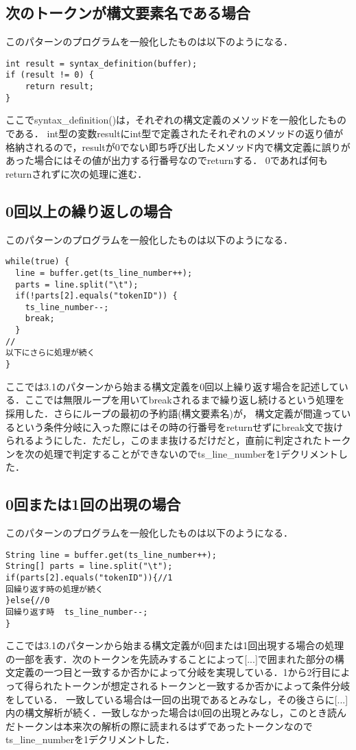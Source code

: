 \documentclass[dvipdfmx]{jarticle}
\begin{document}
\subsection{次のトークンが構文要素名である場合}
このパターンのプログラムを一般化したものは以下のようになる．
\begin{lstlisting}
int result = syntax_definition(buffer);
if (result != 0) {
    return result;
}
\end{lstlisting}
ここでsyntax\_definition()は，それぞれの構文定義のメソッドを一般化したものである．
int型の変数resultにint型で定義されたそれぞれのメソッドの返り値が格納されるので，resultが0でない即ち呼び出したメソッド内で構文定義に誤りがあった場合にはその値が出力する行番号なのでreturnする．
0であれば何もreturnされずに次の処理に進む．
\subsection{0回以上の繰り返しの場合}
このパターンのプログラムを一般化したものは以下のようになる．
\begin{lstlisting}
while(true) {
  line = buffer.get(ts_line_number++);
  parts = line.split("\t");
  if(!parts[2].equals("tokenID")) {
    ts_line_number--;
    break;
  }
//
以下にさらに処理が続く
}
\end{lstlisting}
ここでは3.1のパターンから始まる構文定義を0回以上繰り返す場合を記述している．ここでは無限ループを用いてbreakされるまで繰り返し続けるという処理を採用した．さらにループの最初の予約語(構文要素名)が，
構文定義が間違っているという条件分岐に入った際にはその時の行番号をreturnせずにbreak文で抜けられるようにした．ただし，このまま抜けるだけだと，直前に判定されたトークンを次の処理で判定することができないのでts\_line\_numberを1デクリメントした．
\subsection{0回または1回の出現の場合}
このパターンのプログラムを一般化したものは以下のようになる．
\begin{lstlisting}
String line = buffer.get(ts_line_number++);
String[] parts = line.split("\t");
if(parts[2].equals("tokenID")){//1
回繰り返す時の処理が続く
}else{//0
回繰り返す時  ts_line_number--;
}
\end{lstlisting}
ここでは3.1のパターンから始まる構文定義が0回または1回出現する場合の処理の一部を表す．次のトークンを先読みすることによって[...]で囲まれた部分の構文定義の一つ目と一致するか否かによって分岐を実現している．1から2行目によって得られたトークンが想定されるトークンと一致するか否かによって条件分岐をしている．
一致している場合は一回の出現であるとみなし，その後さらに[...]内の構文解析が続く．一致しなかった場合は0回の出現とみなし，このとき読んだトークンは本来次の解析の際に読まれるはずであったトークンなので
ts\_line\_numberを1デクリメントした．
\end{document}
